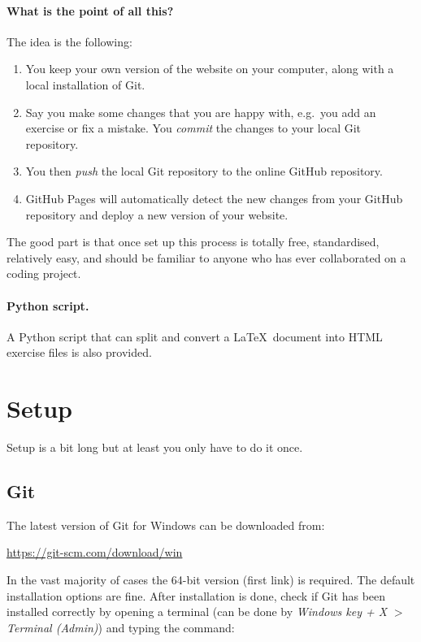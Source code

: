 \documentclass[a4paper,10pt]{article}
\begin{document}
\paragraph{What is the point of all this?} The idea is the following:
\begin{enumerate}
    \item You keep your own version of the website on your computer, along with a local installation of Git.
    \item Say you make some changes that you are happy with, e.g.\ you add an exercise or fix a mistake. You \emph{commit} the changes to your local Git repository.
    \item You then \emph{push} the local Git repository to the online GitHub repository.
    \item GitHub Pages will automatically detect the new changes from your GitHub repository and deploy a new version of your website.
\end{enumerate}
The good part is that once set up this process is totally free, standardised, relatively easy, and should be familiar to anyone who has ever collaborated on a coding project. 

\paragraph{Python script.} A Python script that can split and convert a \LaTeX\ document into HTML exercise files is also provided.

\clearpage
\section{Setup}

Setup is a bit long but at least you only have to do it once.

\subsection{Git}

The latest version of Git for Windows can be downloaded from:

\url{https://git-scm.com/download/win}

In the vast majority of cases the 64-bit version (first link) is required. The default installation options are fine. After installation is done, check if Git has been installed correctly by opening a terminal (can be done by \emph{Windows key + X} $>$ \emph{Terminal (Admin)}) and typing the command: 
\end{document}
